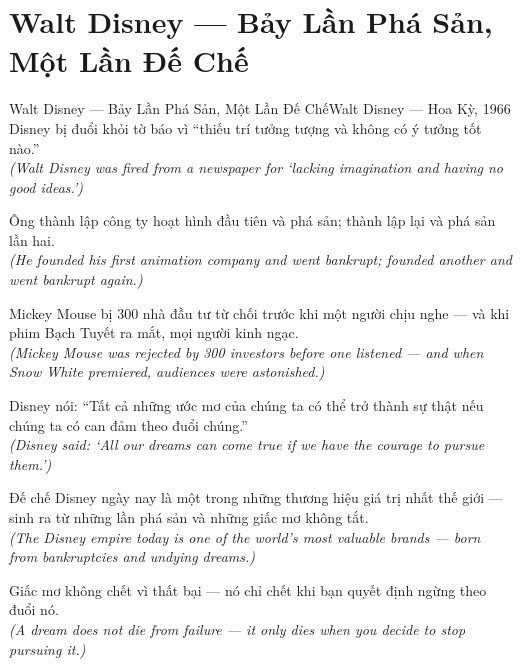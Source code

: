 \section{Walt Disney --- Bảy Lần Phá Sản, Một Lần Đế Chế}
\begin{truyen}{Walt Disney --- Bảy Lần Phá Sản, Một Lần Đế Chế}{Walt Disney --- Hoa Kỳ, 1966}
 Disney bị đuổi khỏi tờ báo vì ``thiếu trí tưởng tượng và không có ý tưởng tốt nào.''\\[4pt]
\textit{(Walt Disney was fired from a newspaper for `lacking imagination and having no good ideas.')}

Ông thành lập công ty hoạt hình đầu tiên và phá sản; thành lập lại và phá sản lần hai.\\[4pt]
\textit{(He founded his first animation company and went bankrupt; founded another and went bankrupt again.)}

Mickey Mouse bị 300 nhà đầu tư từ chối trước khi một người chịu nghe --- và khi phim Bạch Tuyết ra mắt, mọi người kinh ngạc.\\[4pt]
\textit{(Mickey Mouse was rejected by 300 investors before one listened --- and when Snow White premiered, audiences were astonished.)}

Disney nói: ``Tất cả những ước mơ của chúng ta có thể trở thành sự thật nếu chúng ta có can đảm theo đuổi chúng.''\\[4pt]
\textit{(Disney said: `All our dreams can come true if we have the courage to pursue them.')}

Đế chế Disney ngày nay là một trong những thương hiệu giá trị nhất thế giới --- sinh ra từ những lần phá sản và những giấc mơ không tắt.\\[4pt]
\textit{(The Disney empire today is one of the world's most valuable brands --- born from bankruptcies and undying dreams.)}

\end{truyen}
\begin{baihoc}
  Giấc mơ không chết vì thất bại --- nó chỉ chết khi bạn quyết định ngừng theo đuổi nó.\\[4pt]
  \textit{(A dream does not die from failure --- it only dies when you decide to stop pursuing it.)}
\end{baihoc}

